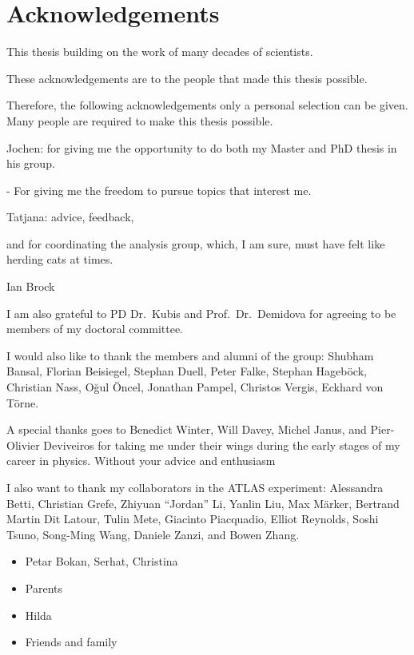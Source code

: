 \chapter*{Acknowledgements}%
\label{sec:ack}

This thesis building on the work of many decades of scientists.

These acknowledgements are to the people that made this thesis possible.

Therefore, the
following acknowledgements only a personal selection can be given. Many people
are required to make this thesis possible.


Jochen: for giving me the opportunity to do both my Master and PhD thesis in his
group.

- For giving me the freedom to pursue topics that interest me.


Tatjana: advice, feedback,

and for coordinating the \bbtautau analysis group, which, I am sure, must have
felt like herding cats at times.


Ian Brock

I am also grateful to PD Dr.\ Kubis and Prof.\ Dr.\ Demidova for agreeing to be
members of my doctoral committee.

I would also like to thank the members and alumni of the group: Shubham Bansal,
Florian Beisiegel, Stephan Duell, Peter Falke, Stephan Hageböck, Christian Nass,
Oğul Öncel, Jonathan Pampel, Christos Vergis, Eckhard von Törne.

A special thanks goes to Benedict Winter, Will Davey, Michel Janus, and
Pier-Olivier Deviveiros for taking me under their wings during the early stages
of my career in physics. Without your advice and enthusiasm

I also want to thank my collaborators in the ATLAS experiment: Alessandra Betti,
Christian Grefe, Zhiyuan ``Jordan'' Li, Yanlin Liu, Max Märker, Bertrand Martin
Dit Latour, Tulin Mete, Giacinto Piacquadio, Elliot Reynolds, Soshi Tsuno,
Song-Ming Wang, Daniele Zanzi, and Bowen Zhang.


\begin{itemize}

\item Petar Bokan, Serhat, Christina

\item Parents

\item Hilda

\item Friends and family

\end{itemize}

